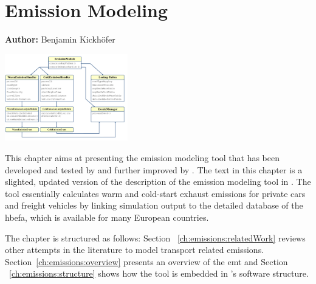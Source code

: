 \chapter{Emission Modeling}
\label{ch:emissions}

\hfill \textbf{Author:} Benjamin Kickhöfer

\begin{center} \includegraphics[width=0.4\textwidth, angle=0]{extending/figures/emissionToolOverview_pdfa.pdf} \end{center}

{\citet{HuelsmannEtAl_LAS_2011,KickhoeferEtAl_VanoutriveVerhetsel_2013,KickhoeferNagel2011MappingEmissions,KickhoeferEtAl_NSE_2013,HuelsmannEtAl_GerikeEtAl_2013,Kickhoefer_PhDThesis_2014,KickhoeferKern_MobilTUM_2014}}

This chapter aims at presenting the emission modeling tool that has been developed and tested by \citet{HuelsmannEtAl_LAS_2011} and further improved by \citet{KickhoeferEtAl_VanoutriveVerhetsel_2013}. The text in this chapter is a slighted, updated version of the description of the emission modeling tool in \citet{Kickhoefer_PhDThesis_2014}.
%
The tool essentially calculates warm and cold-start exhaust emissions for private cars and freight vehicles by linking  simulation output to the detailed database of the \gls{hbefa}, which is available for many European countries.

The chapter is structured as follows:
%
Section ~\ref{ch:emissions:relatedWork} reviews other attempts in the literature to model transport related emissions. Section~\ref{ch:emissions:overview} presents an overview of the \gls{emt} and Section ~\ref{ch:emissions:structure} shows how the tool is embedded in 's software structure.

